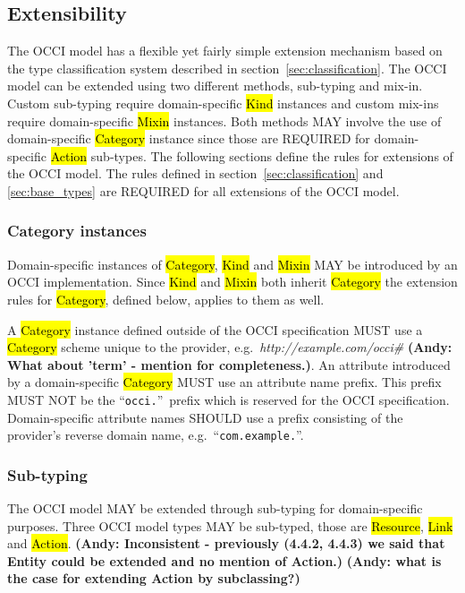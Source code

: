 \documentclass[10pt,a4paper]{article}
\begin{document}
\subsection{Extensibility}
\label{sec:extensibility}
The OCCI model has a flexible yet fairly simple extension mechanism based on
the type classification system described in section~\ref{sec:classification}.
%
The OCCI model can be extended using two different methods, sub-typing and
mix-in. Custom sub-typing require domain-specific \hl{Kind} instances and
custom mix-ins require domain-specific \hl{Mixin} instances.  Both methods MAY
involve the use of domain-specific \hl{Category} instance since those are
REQUIRED for domain-specific \hl{Action} sub-types.  The following sections
define the rules for extensions of the OCCI model.
%
The rules defined in section~\ref{sec:classification} and \ref{sec:base_types}
are REQUIRED for all extensions of the OCCI model.

\subsubsection{Category instances}
\label{sec:ext:category}
Domain-specific instances of \hl{Category}, \hl{Kind} and \hl{Mixin} MAY be
introduced by an OCCI implementation. Since \hl{Kind} and \hl{Mixin} both
inherit \hl{Category} the extension rules for \hl{Category}, defined below,
applies to them as well.

A \hl{Category} instance defined outside of the OCCI specification MUST use a
\hl{Category} scheme unique to the provider,
e.g.~\textit{http://example.com/occi\#} \textbf{(Andy: What about 'term' - mention for completeness.)}.
%
An attribute introduced by a domain-specific \hl{Category} MUST
use an attribute name prefix. This prefix MUST NOT be the ``\texttt{occi.}''~prefix
which is reserved for the OCCI specification. Domain-specific attribute names
SHOULD use a prefix consisting of the provider's reverse domain name,
e.g.~``\texttt{com.example.}''.

\subsubsection{Sub-typing}
The OCCI model MAY be extended through sub-typing for domain-specific purposes.
Three OCCI model types MAY be sub-typed, those are \hl{Resource}, \hl{Link} and
\hl{Action}. \textbf{(Andy: Inconsistent - previously (4.4.2, 4.4.3) we said that Entity 
could be extended and no mention of Action.)} 
\textbf{(Andy: what is the case for extending Action by subclassing?)}
\end{document}

